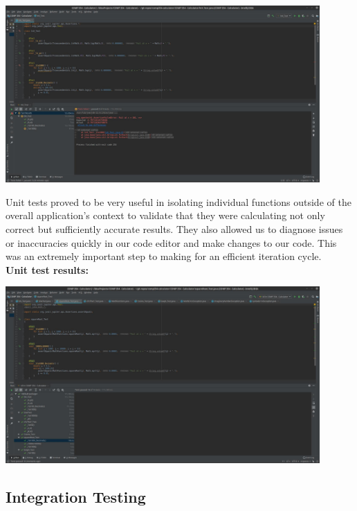 \documentclass[a4paper, 12pt]{article}
\begin{document}
\vspace{8mm}
\begin{centering}
\includegraphics[width=0.9\textwidth]{Testing_1.jpg}
\end{centering}
\vspace{8mm}

Unit tests proved to be very useful in isolating individual functions outside of the overall application's context to validate that they were calculating not only correct but sufficiently accurate results. They also allowed us to diagnose issues or inaccuracies quickly in our code editor and make changes to our code. This was an extremely important step to making for an efficient iteration cycle.
\\

\textbf{Unit test results:}
\\

\vspace{8mm}
\begin{centering}
\includegraphics[width=0.9\textwidth]{testresults.jpg}
\end{centering}
\vspace{8mm}



\subsection{Integration Testing}
\end{document}
